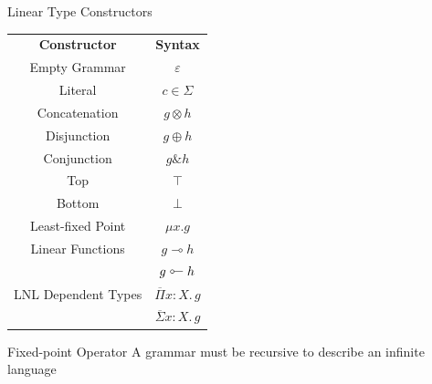 \documentclass[10pt]{beamer}
\newcommand{\lto}{\multimap}
\newcommand{\tol}{\mathrel{\rotatebox[origin=c]{180}{$\lto$}}}
\newcommand{\LinPiTy}[3]{\overline\Pi #1 : #2.\, #3}
\newcommand{\LinSigTy}[3]{\overline\Sigma #1 : #2.\, #3}
\newcommand{\amp}{\mathrel{\&}}
\begin{document}
\begin{frame}{Linear Type Constructors}
  \begin{center}
  \begin{tabular}{c c}
    \textbf{Constructor} & \textbf{Syntax} \\
    Empty Grammar & $\varepsilon$ \\
    Literal & $c \in \Sigma$ \\
    Concatenation & $g \otimes h$ \\
    Disjunction & $g \oplus h$ \\
    Conjunction & $g \amp h$ \\
    Top & $\top$ \\
    Bottom & $\bot$ \\
    Least-fixed Point & $\mu x . g$ \\
    Linear Functions & $g \lto h$ \\
     & $g \tol h$ \\
    LNL Dependent Types & $\LinPiTy {x} {X} {g}$ \\
    & $\LinSigTy {x} {X} {g}$
  \end{tabular}
  \end{center}
\end{frame}

\begin{frame}{Fixed-point Operator}
  A grammar must be recursive to describe an infinite language

\end{frame}
\end{document}
